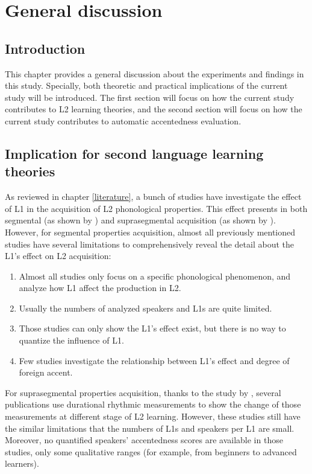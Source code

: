 \chapter{General discussion}
\label{discussion}

\section{Introduction}

This chapter provides a general discussion about the experiments and findings in this study. Specially, both theoretic and practical implications of the current study will be introduced. The first section will focus on how the current study contributes to L2 learning theories, and the second section will focus on how the current study contributes to automatic accentedness evaluation.

\section{Implication for second language learning theories}

As reviewed in chapter \ref{literature}, a bunch of studies have investigate the effect of L1 in the acquisition of L2 phonological properties. This effect presents in both segmental (as shown by \cite{strange1992learning, flege1987production, chang2008phonetic, munro1993productions, derakhshan2015interference}) and suprasegmental acquisition (as shown by \cite{mennen2004bi, stockmal2005measures, white2007calibrating, lin2008interlanguage, li2014l2, ordin2015acquisition}). However, for segmental properties acquisition, almost all previously mentioned studies have several limitations to comprehensively reveal the detail about the L1's effect on L2 acquisition:

\begin{enumerate}
\item Almost all studies only focus on a specific phonological phenomenon, and analyze how L1 affect the production in L2.
\item Usually the numbers of analyzed speakers and L1s are quite limited.
\item Those studies can only show the L1's effect exist, but there is no way to quantize the influence of L1.
\item Few studies investigate the relationship between L1's effect and degree of foreign accent.
\end{enumerate}

For suprasegmental properties acquisition, thanks to the study by \cite{ramus1999correlates,grabe2002durational}, several publications use durational rhythmic measurements to show the change of those measurements at different stage of L2 learning. However, these studies still have the similar limitations that the numbers of L1s and speakers per L1 are small. Moreover, no quantified speakers' accentedness scores are available in those studies, only some qualitative ranges (for example, from beginners to advanced learners).

